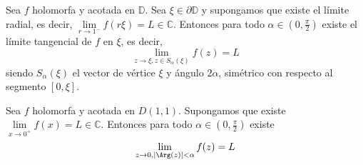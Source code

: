 \begin{theorem}
    Sea $f$ holomorfa y acotada en $\mathbb{D}$.
    Sea $\xi \in \partial \mathbb{D}$ y supongamos que existe el límite radial, es decir, $\lim\limits_{r \to 1^-} f(r\xi) = L \in \mathbb{C}$.
    Entonces para todo $\alpha \in (0, \frac{\pi}{2})$ existe el límite tangencial de $f$ en $\xi$, es decir,
    $$\lim\limits_{z \to \xi, z \in S_\alpha(\xi)} f(z) = L$$
    siendo $S_\alpha(\xi)$ el vector de vértice $\xi$ y ángulo $2\alpha$, simétrico con respecto al segmento $[0, \xi]$.
\end{theorem}

\begin{theorem}
    Sea $f$ holomorfa y acotada en $D(1, 1)$.
    Supongamos que existe $\lim\limits_{x \to 0^+} f(x) = L \in \mathbb{C}$.
    Entonces para todo $\alpha \in (0, \frac{\pi}{2})$ existe
    $$\lim\limits_{z \to 0, |\Arg(z)| < \alpha} f(z) = L$$
\end{theorem}

